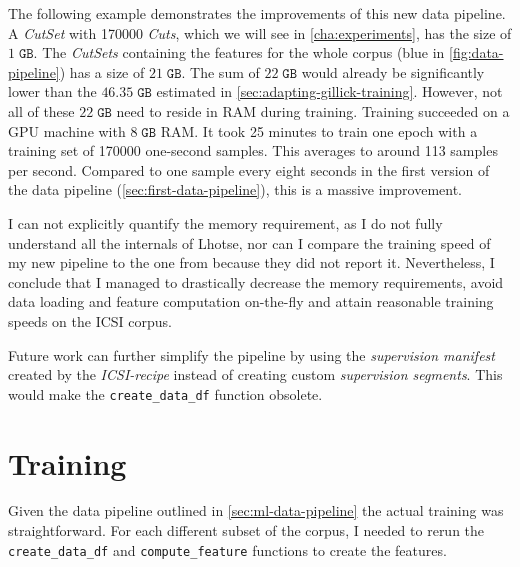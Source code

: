 \documentclass[bsc,frontabs,parskip,deptreport]{infthesis}
\begin{document}
The following example demonstrates the improvements of this new data pipeline.
A \textit{CutSet} with 170000 \textit{Cuts}, which we will see in \autoref{cha:experiments}, has the size of $1\;\mathtt{GB}$.
The \textit{CutSets} containing the features for the whole corpus (blue in \autoref{fig:data-pipeline}) has a size of $21\;\mathtt{GB}$. 
The sum of $22\;\mathtt{GB}$ would already be significantly lower than the $46.35\;\mathtt{GB}$ estimated in \autoref{sec:adapting-gillick-training}. However, not all of these $22\;\mathtt{GB}$ need to reside in RAM during training. 
Training succeeded on a GPU machine with $8\;\mathtt{GB}$ RAM. It took 25 minutes to train one epoch with a training set of 170000 one-second samples.
This averages to around 113 samples per second. Compared to one sample every eight seconds in the first version of the data pipeline (\autoref{sec:first-data-pipeline}), this is a massive improvement.

I can not explicitly quantify the memory requirement, as I do not fully understand all the internals of Lhotse, nor can I compare the training speed of my new pipeline to the one from \citet{gillick2021robust} because they did not report it.
Nevertheless, I conclude that I managed to drastically decrease the memory requirements, avoid data loading and feature computation on-the-fly and attain reasonable training speeds on the ICSI corpus.

Future work can further simplify the pipeline by using the \textit{supervision manifest} created by the \textit{ICSI-recipe} instead of creating custom \textit{supervision segments}. This would make the \verb|create_data_df| function obsolete. 


\section{Training}
Given the data pipeline outlined in \autoref{sec:ml-data-pipeline} the actual training was straightforward. For each different subset of the corpus, I needed to rerun the \verb|create_data_df| and \verb|compute_feature| functions to create the features. 
\end{document}
